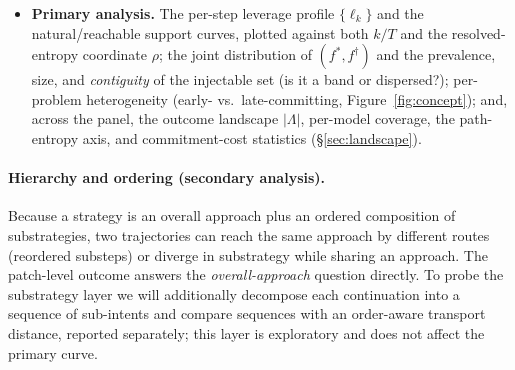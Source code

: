 \documentclass[11pt]{article}
\begin{document}
\begin{itemize}[leftmargin=1.4em,itemsep=2pt,topsep=2pt]
is the single-instance SymPy estimator check above (\texttt{sympy-22714},
behavioral-signature clustering; $n=1$, $f^\ast=0$,
$\widehat{H}_{\mathrm{MM}}=0$ at every measured fraction $\{0,0.5,0.9\}$), which neither
establishes nor refutes cross-repo generality; the panel therefore stands at zero
non-SymPy repositories---and, being degenerate, supplies no
nonzero SymPy baseline against which a second repository could be compared: with all
$\ell_k=0$ the predicted leverage-concentration check (Gini of $\{\ell_k\}>0.5$) is
undefined, and $f^\dagger$ awaits the forced-diverse reachable-support run.
The comparison must moreover respect a per-repository constraint: because behavioral
equivalence is defined relative to each instance's \emph{own} held-out suite
(\S\ref{sec:instrument}), signatures are computed per-suite and are never compared
across repositories; the ordering $f^\ast\le f^\dagger$ is read \emph{within} each
repo, and only the \emph{shape} of its curves---not the outcome classes
themselves---transfers across the panel. This also bounds what such a panel could
extend: prior survival/change-point evidence of collapse is single-turn and
single-domain~\citep{bigelow2024forking}, so a cross-repo result would extend that
collapse phenomenon to a multi-step agent over structurally distinct codebases.
The cross-repo comparison therefore remains entirely to be produced.
\item \textbf{Primary analysis.} The per-step leverage profile $\{\ell_k\}$ and the
natural/reachable support curves, plotted against both $k/T$ and the resolved-entropy
coordinate $\rho$; the joint distribution of $(f^\ast,f^\dagger)$ and the prevalence,
size, and \emph{contiguity} of the injectable set (is it a band or dispersed?);
per-problem heterogeneity (early- vs.\ late-committing, Figure~\ref{fig:concept});
and, across the panel, the outcome landscape $\lvert\Lambda\rvert$, per-model
coverage, the path-entropy axis, and commitment-cost statistics
(\S\ref{sec:landscape}).
\end{itemize}

\paragraph{Hierarchy and ordering (secondary analysis).}
Because a strategy is an overall approach plus an ordered composition of
substrategies, two trajectories can reach the same approach by different routes
(reordered substeps) or diverge in substrategy while sharing an approach. The
patch-level outcome answers the \emph{overall-approach} question directly. To probe
the substrategy layer we will additionally decompose each continuation into a
sequence of sub-intents and compare sequences with an order-aware transport
distance, reported separately; this layer is exploratory and does not affect the
primary curve.
\end{document}
